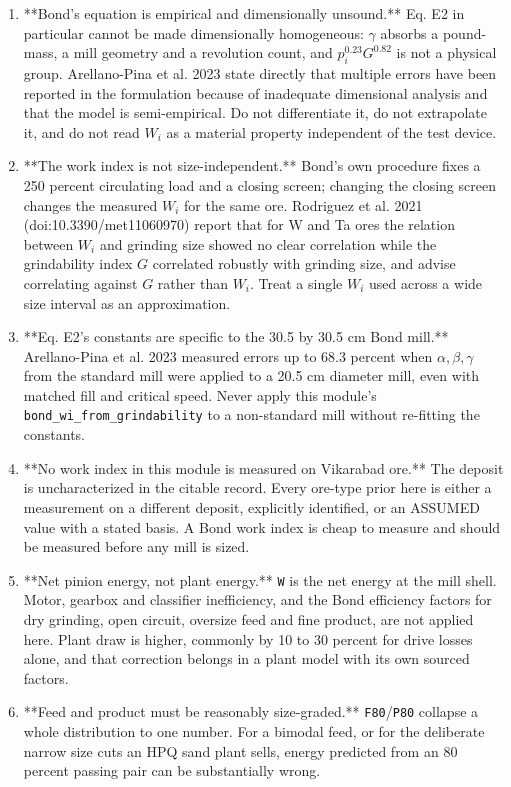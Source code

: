 \documentclass[10pt,a4paper,twoside]{report}
\begin{document}
\begin{enumerate}[leftmargin=*,label=\arabic*.]
\item **Bond's equation is empirical and dimensionally unsound.** Eq. E2 in particular cannot be made dimensionally homogeneous: $\gamma$ absorbs a pound-mass, a mill geometry and a revolution count, and $p_i^{0.23} G^{0.82}$ is not a physical group. Arellano-Pina et al. 2023 state directly that multiple errors have been reported in the formulation because of inadequate dimensional analysis and that the model is semi-empirical. Do not differentiate it, do not extrapolate it, and do not read $W_i$ as a material property independent of the test device.
\item **The work index is not size-independent.** Bond's own procedure fixes a 250 percent circulating load and a closing screen; changing the closing screen changes the measured $W_i$ for the same ore. Rodriguez et al. 2021 (doi:10.3390/met11060970) report that for W and Ta ores the relation between $W_i$ and grinding size showed no clear correlation while the grindability index $G$ correlated robustly with grinding size, and advise correlating against $G$ rather than $W_i$. Treat a single $W_i$ used across a wide size interval as an approximation.
\item **Eq. E2's constants are specific to the 30.5 by 30.5 cm Bond mill.** Arellano-Pina et al. 2023 measured errors up to 68.3 percent when $\alpha, \beta, \gamma$ from the standard mill were applied to a 20.5 cm diameter mill, even with matched fill and critical speed. Never apply this module's \texttt{bond\_wi\_from\_grindability} to a non-standard mill without re-fitting the constants.
\item **No work index in this module is measured on Vikarabad ore.** The deposit is uncharacterized in the citable record. Every ore-type prior here is either a measurement on a different deposit, explicitly identified, or an ASSUMED value with a stated basis. A Bond work index is cheap to measure and should be measured before any mill is sized.
\item **Net pinion energy, not plant energy.** \texttt{W} is the net energy at the mill shell. Motor, gearbox and classifier inefficiency, and the Bond efficiency factors for dry grinding, open circuit, oversize feed and fine product, are not applied here. Plant draw is higher, commonly by 10 to 30 percent for drive losses alone, and that correction belongs in a plant model with its own sourced factors.
\item **Feed and product must be reasonably size-graded.** \texttt{F80}/\texttt{P80} collapse a whole distribution to one number. For a bimodal feed, or for the deliberate narrow size cuts an HPQ sand plant sells, energy predicted from an 80 percent passing pair can be substantially wrong.
\end{enumerate}
\end{document}
